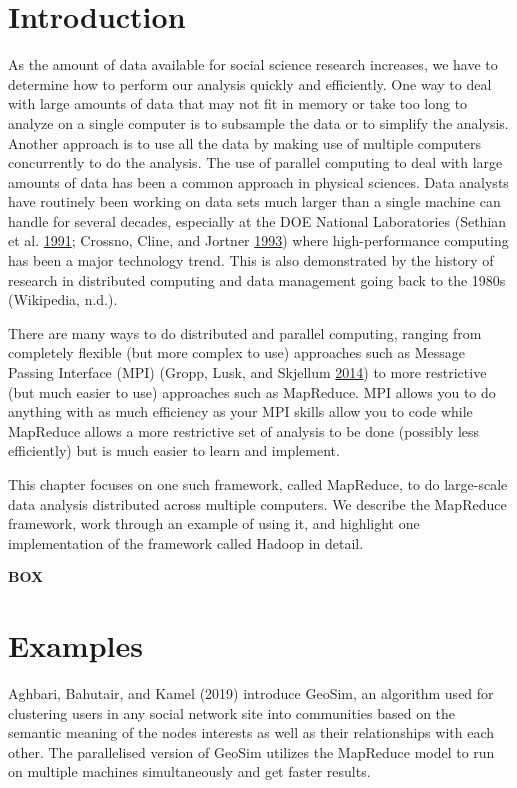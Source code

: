 \documentclass[]{krantz}
\begin{document}
\section{Introduction}\label{introduction-1}

As the amount of data available for social science research increases,
we have to determine how to perform our analysis quickly and
efficiently. One way to deal with large amounts of data that may not fit
in memory or take too long to analyze on a single computer is to
subsample the data or to simplify the analysis. Another approach is to
use all the data by making use of multiple computers concurrently to do
the analysis. The use of parallel computing to deal with large amounts
of data has been a common approach in physical sciences. Data analysts
have routinely been working on data sets much larger than a single
machine can handle for several decades, especially at the DOE National
Laboratories (Sethian et al. \protect\hyperlink{ref-bigdata_old1}{1991};
Crossno, Cline, and Jortner
\protect\hyperlink{ref-crossno1993heterogeneous}{1993}) where
high-performance computing has been a major technology trend. This is
also demonstrated by the history of research in distributed computing
and data management going back to the 1980s (Wikipedia, n.d.).

There are many ways to do distributed and parallel computing, ranging
from completely flexible (but more complex to use) approaches such as
Message Passing Interface (MPI) (Gropp, Lusk, and Skjellum
\protect\hyperlink{ref-mpi}{2014}) to more restrictive (but much easier
to use) approaches such as MapReduce. MPI allows you to do anything with
as much efficiency as your MPI skills allow you to code while MapReduce
allows a more restrictive set of analysis to be done (possibly less
efficiently) but is much easier to learn and implement.

This chapter focuses on one such framework, called MapReduce, to do
large-scale data analysis distributed across multiple computers. We
describe the MapReduce framework, work through an example of using it,
and highlight one implementation of the framework called Hadoop in
detail.

\textbf{BOX}

\section{Examples}\label{sec:examples}

Aghbari, Bahutair, and Kamel (2019) introduce GeoSim, an algorithm used
for clustering users in any social network site into communities based
on the semantic meaning of the nodes interests as well as their
relationships with each other. The parallelised version of GeoSim
utilizes the MapReduce model to run on multiple machines simultaneously
and get faster results.
\end{document}
